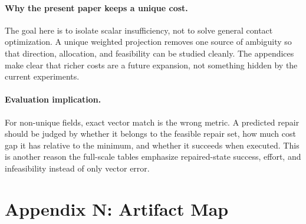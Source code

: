 \documentclass{article}
\begin{document}
\paragraph{Why the present paper keeps a unique cost.}
The goal here is to isolate scalar insufficiency, not to solve general contact optimization. A unique weighted projection removes one source of ambiguity so that direction, allocation, and feasibility can be studied cleanly. The appendices make clear that richer costs are a future expansion, not something hidden by the current experiments.

\paragraph{Evaluation implication.}
For non-unique fields, exact vector match is the wrong metric. A predicted repair should be judged by whether it belongs to the feasible repair set, how much cost gap it has relative to the minimum, and whether it succeeds when executed. This is another reason the full-scale tables emphasize repaired-state success, effort, and infeasibility instead of only vector error.

\clearpage
\section{Appendix N: Artifact Map}

\begin{center}
\scriptsize
{}
\end{center}
\end{document}
